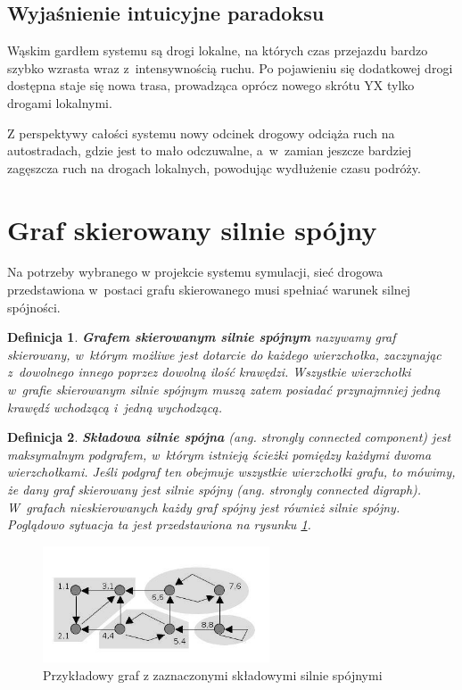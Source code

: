 \documentclass[twoside,12pt]{report}
\newtheorem{definition}{Definicja} %
\begin{document}
\subsection{Wyjaśnienie intuicyjne paradoksu}
Wąskim gardłem systemu są drogi lokalne, na których czas przejazdu bardzo szybko wzrasta wraz z~intensywnością ruchu. Po pojawieniu się dodatkowej drogi dostępna staje się nowa trasa, prowadząca oprócz nowego skrótu YX tylko drogami lokalnymi.

Z perspektywy całości systemu nowy odcinek drogowy odciąża ruch na autostradach, gdzie jest to mało odczuwalne, a~w~zamian jeszcze bardziej zagęszcza ruch na drogach lokalnych, powodując wydłużenie czasu podróży.

\section{Graf skierowany silnie spójny}
Na potrzeby wybranego w projekcie systemu symulacji, sieć drogowa przedstawiona w~postaci grafu skierowanego musi spełniać warunek silnej spójności. 

\begin{definition}
\textbf{Grafem skierowanym silnie spójnym} nazywamy graf skierowany, w~którym możliwe jest dotarcie do każdego wierzchołka, zaczynając z~dowolnego innego poprzez dowolną ilość krawędzi. Wszystkie wierzchołki w~grafie skierowanym silnie spójnym muszą zatem posiadać przynajmniej jedną krawędź wchodzącą i~jedną wychodzącą\cite{silniespojny}.
\end{definition}

\begin{definition}
\textbf{Składowa silnie spójna} (ang. strongly connected component) jest maksymalnym podgrafem, w~którym istnieją ścieżki pomiędzy każdymi dwoma wierzchołkami. Jeśli podgraf ten obejmuje wszystkie wierzchołki grafu, to mówimy, że dany graf skierowany jest silnie spójny (ang. strongly connected digraph). W~grafach nieskierowanych każdy graf spójny jest również silnie spójny. Poglądowo sytuacja ta jest przedstawiona na rysunku \ref{fig:ex_silnie_spojna}.
\end{definition}

\begin{figure}[htbp]
	\centering
	\includegraphics[width=0.6\textwidth]{img/tajran}
	\caption{Przykładowy graf z zaznaczonymi składowymi silnie spójnymi}
	\label{fig:ex_silnie_spojna}
\end{figure}
\end{document}
